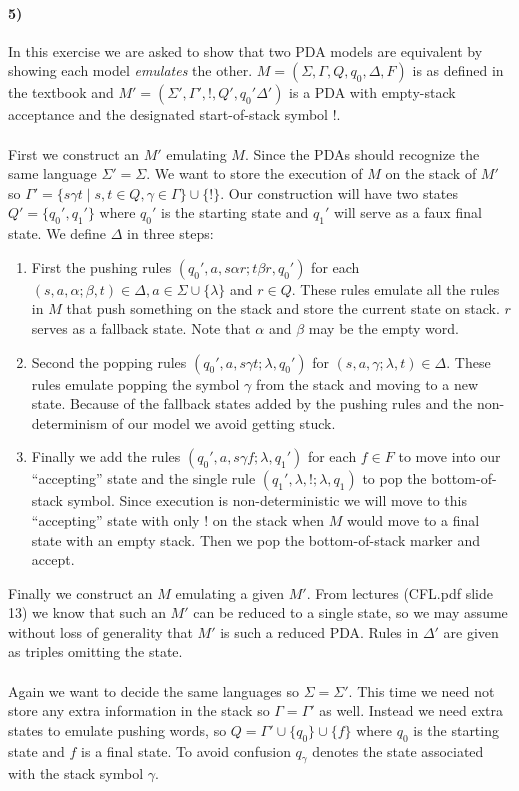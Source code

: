 \documentclass[defaultpackages]{simplereport}
\begin{document}
\paragraph{\textbf{5)}} In this exercise we are asked to show that two PDA models
  are equivalent by showing each model \textit{emulates} the other. $M = (\Sigma,
  \Gamma, Q, q_0, \Delta, F)$ is as defined in the textbook and $M' = (\Sigma',
  \Gamma', !, Q', q_0' \Delta')$ is a PDA with empty-stack acceptance and the
  designated start-of-stack symbol $!$.
  \\\\
  First we construct an $M'$ emulating $M$. Since the PDAs should recognize the
  same language $\Sigma' = \Sigma$. We want to store the execution of
  $M$ on the stack of $M'$ so $\Gamma' = \{s \gamma t \mid s,t \in Q, \gamma \in
  \Gamma\} \cup \{!\}$. Our construction will have two states $Q' = \{q_0', q_1'\}$
  where $q_0'$ is the starting state and $q_1'$ will serve as a faux final
  state. We define $\Delta$ in three steps:
  \begin{enumerate}
  \item First the pushing rules $(q_0', a, s \alpha r; t \beta r, q_0')$ for each $(s, a,
  \alpha ; \beta, t) \in \Delta, a \in \Sigma \cup \{\lambda\}$ and $r \in Q$.
  These rules emulate all the rules in $M$ that push something on the stack and
  store the current state on stack. $r$ serves as a fallback state. Note that
  $\alpha$ and $\beta$ may be the empty word.
  \item Second the popping rules $(q_0', a, s \gamma t; \lambda, q_0')$ for $(s, a,
  \gamma; \lambda, t) \in \Delta$. These rules emulate popping the symbol
  $\gamma$ from the stack and moving to a new state. Because of the fallback
  states added by the pushing rules and the non-determinism of our model we
  avoid getting stuck.
  \item Finally we add the rules $(q_0', a, s \gamma f; \lambda, q_1')$ for each $f
  \in F$ to move into our ``accepting'' state and the single rule $(q_1',
  \lambda, !; \lambda, q_1)$ to pop the bottom-of-stack symbol. Since execution
  is non-deterministic we will move to this ``accepting'' state with only $!$ on
  the stack when $M$ would move to a final state with an empty stack. Then we
  pop the bottom-of-stack marker and accept.
  \end{enumerate}
  Finally we construct an $M$ emulating a given $M'$. From lectures (CFL.pdf
  slide 13) we know that such an $M'$ can be reduced to a single state, so we
  may assume without loss of generality that $M'$ is such a reduced PDA. Rules
  in $\Delta'$ are given as triples omitting the state.
  \\\\
  Again we want to decide the same languages so $\Sigma = \Sigma'$. This time we
  need not store any extra information in the stack so $\Gamma = \Gamma'$ as
  well. Instead we need extra states to emulate pushing words, so $Q = \Gamma'
  \cup \{q_0\} \cup \{f\}$ where $q_0$ is the starting state and $f$ is a final
  state. To avoid confusion $q_\gamma$ denotes the state associated with the
  stack symbol $\gamma$.
\end{document}

